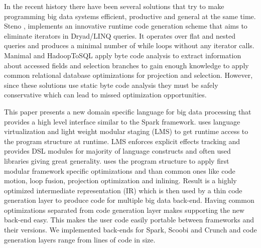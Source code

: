 In the recent history there have been several solutions that try to make programming big data systems efficient, productive and general at the same time. Steno \cite{murray_steno:_2011}, implements an innovative runtime code generation scheme that aims to eliminate iterators in Dryad/LINQ queries. It operates over flat and nested queries and produces a minimal number of while loops without any iterator calls. Manimal \cite{jahani_automatic_2011} and HadoopToSQL \cite{iu_hadooptosql:_2010} apply byte code analysis to extract information about accessed fields and selection branches to gain enough knowledge to apply common relational database optimizations for projection and selection. However, since these solutions use static byte code analysis they must be safely conservative which can lead to missed optimization opportunities.         

This paper presents a new domain specific language \tool for big data processing that provides a high level interface similar to the Spark framework. \tool uses language virtualization \cite{moors_scala-virtualized_2012} and light weight modular staging (LMS)\cite{rompf_lightweight_2010} to get runtime access to the program structure at runtime. LMS enforces explicit effects tracking and provides DSL modules for majority of language constructs and often used libraries giving \tool great generality. \tool uses the program structure to apply first modular framework specific optimizations and than common ones like code motion, loop fusion, projection optimization and inlining. Result is a highly optimized intermediate representation (IR) which is then used by a thin code generation layer to produce code for multiple big data back-end. Having common optimizations separated from code generation layer makes supporting the new back-end  easy. This makes the user code easily portable between frameworks and their versions. We implemented back-ends for Spark, Scoobi \cite{nicta_scoobi_2012} and Crunch \cite{_crunch_2012} and code generation layers range from  lines of code in size. 



